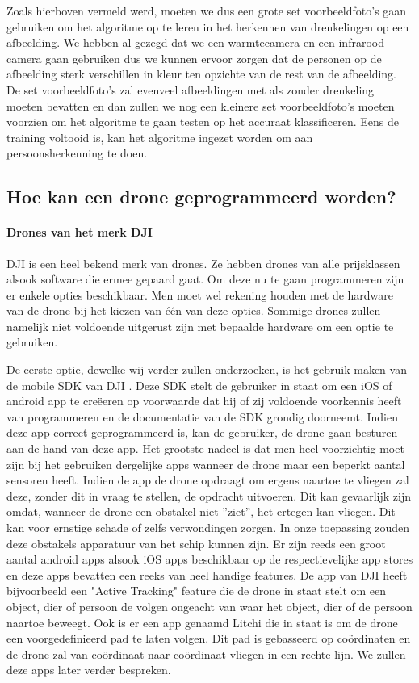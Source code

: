 Zoals hierboven vermeld werd, moeten we dus een grote set voorbeeldfoto's gaan gebruiken om het algoritme op te leren in het herkennen van drenkelingen op een afbeelding. We hebben al gezegd dat we een warmtecamera en een infrarood camera gaan gebruiken dus we kunnen ervoor zorgen dat de personen op de afbeelding sterk verschillen in kleur ten opzichte van de rest van de afbeelding. De set voorbeeldfoto's zal evenveel afbeeldingen met als zonder drenkeling moeten bevatten en dan zullen we nog een kleinere set voorbeeldfoto's moeten voorzien om het algoritme te gaan testen op het accuraat klassificeren. Eens de training voltooid is, kan het algoritme ingezet worden om aan persoonsherkenning te doen.

\subsection{Hoe kan een drone geprogrammeerd worden?}

\paragraph{Drones van het merk DJI}

DJI is een heel bekend merk van drones. Ze hebben drones van alle prijsklassen alsook software die ermee gepaard gaat. Om deze nu te gaan programmeren zijn er enkele opties beschikbaar. Men moet wel rekening houden met de hardware van de drone bij het kiezen van één van deze opties. Sommige drones zullen namelijk niet voldoende uitgerust zijn met bepaalde hardware om een optie te gebruiken.

De eerste optie, dewelke wij verder zullen onderzoeken, is het gebruik maken van de mobile SDK van DJI \autocite{MobileSDKDJI}. Deze SDK stelt de gebruiker in staat om een iOS of android app te creëeren op voorwaarde dat hij of zij voldoende voorkennis heeft van programmeren en de documentatie van de SDK grondig doorneemt. Indien deze app correct geprogrammeerd is, kan de gebruiker, de drone gaan besturen aan de hand van deze app. Het grootste nadeel is dat men heel voorzichtig moet zijn bij het gebruiken dergelijke apps wanneer de drone maar een beperkt aantal sensoren heeft. Indien de app de drone opdraagt om ergens naartoe te vliegen zal deze, zonder dit in vraag te stellen, de opdracht uitvoeren. Dit kan gevaarlijk zijn omdat, wanneer de drone een obstakel niet ''ziet'', het ertegen kan vliegen. Dit kan voor ernstige schade of zelfs verwondingen zorgen. In onze toepassing zouden deze obstakels apparatuur van het schip kunnen zijn. Er zijn reeds een groot aantal android apps alsook iOS apps beschikbaar op de respectievelijke app stores en deze apps bevatten een reeks van heel handige features. De app van DJI \autocite{DJIGo4} heeft bijvoorbeeld een "Active Tracking" feature die de drone in staat stelt om een object, dier of persoon de volgen ongeacht van waar het object, dier of de persoon naartoe beweegt. Ook is er een app genaamd Litchi \autocite{Litchi} die in staat is om de drone een voorgedefinieerd pad te laten volgen. Dit pad is gebasseerd op coördinaten en de drone zal van coördinaat naar coördinaat vliegen in een rechte lijn. We zullen deze apps later verder bespreken.

